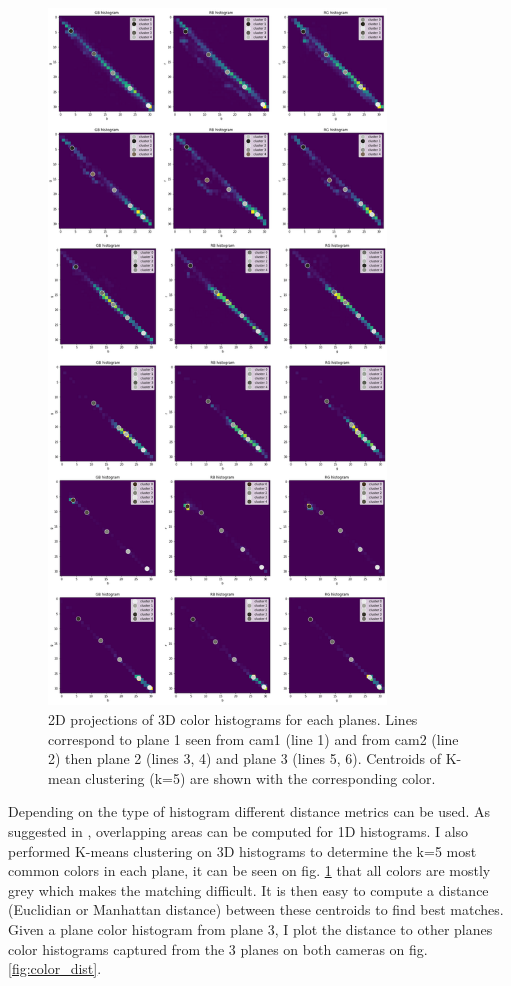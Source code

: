 \begin{figure}[h!]
\centering
\includegraphics[width=0.8\textwidth]{images/kmeans_3D_hist.png}
\caption{2D projections of 3D color histograms for each planes. Lines correspond to plane 1 seen from cam1 (line 1) and from cam2 (line 2) then plane 2 (lines 3, 4) and plane 3 (lines 5, 6). Centroids of K-mean clustering (k=5) are shown with the corresponding color.}
\label{fig:3D_hist}
\end{figure}

Depending on the type of histogram different distance metrics can be used. As suggested in \cite{mdou2013}, overlapping areas can be computed for 1D histograms. I also performed K-means clustering on 3D histograms to determine the k=5 most common colors in each plane, it can be seen on fig. \ref{fig:3D_hist} that all colors are mostly grey which makes the matching difficult. It is then easy to compute a distance (Euclidian or Manhattan distance) between these centroids to find best matches. Given a plane color histogram from plane 3, I plot the distance to other planes color histograms captured from the 3 planes on both cameras on fig. \ref{fig:color_dist}. \

